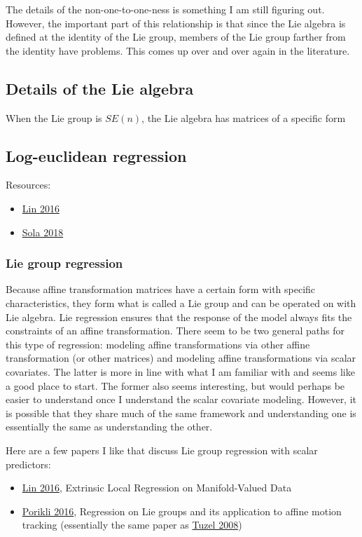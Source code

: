 \documentclass[11pt]{article}
\theoremstyle{definition}
\begin{document}
The details of the non-one-to-one-ness is something I am still figuring out. However, the important part of this relationship is that since the Lie algebra is defined at the identity of the Lie group, members of the Lie group farther from the identity have problems. This comes up over and over again in the literature.

\subsection{Details of the Lie algebra}

When the Lie group is $SE(n)$, the Lie algebra has matrices of a specific form 

\subsection{Log-euclidean regression}

Resources:
\begin{itemize}
    \item \href{https://www.tandfonline.com/doi/full/10.1080/01621459.2016.1208615#abstract}{Lin 2016}
    \item \href{https://arxiv.org/abs/1812.01537}{Sola 2018}
\end{itemize}


\subsubsection{Lie group regression}

Because affine transformation matrices have a certain form with specific characteristics, they form what is called a Lie group and can be operated on with Lie algebra. Lie regression ensures that the response of the model always fits the constraints of an affine transformation. There seem to be two general paths for this type of regression: modeling affine transformations via other affine transformation (or other matrices) and modeling affine transformations via scalar covariates. The latter is more in line with what I am familiar with and seems like a good place to start. The former also seems interesting, but would perhaps be easier to understand once I understand the scalar covariate modeling. However, it is possible that they share much of the same framework and understanding one is essentially the same as understanding the other. 

Here are a few papers I like that discuss Lie group regression with scalar predictors:
\begin{itemize}
    \item \href{https://www.tandfonline.com/doi/full/10.1080/01621459.2016.1208615#abstract}{Lin 2016}, Extrinsic Local Regression on Manifold-Valued Data
    \item \href{https://link.springer.com/chapter/10.1007/978-3-319-45026-1_7}{Porikli 2016}, Regression on Lie groups and its application to affine motion tracking (essentially the same paper as \href{https://www.researchgate.net/publication/221362444_Learning_on_lie_groups_for_invariant_detection_and_tracking}{Tuzel 2008})
\end{itemize}
\end{document}
